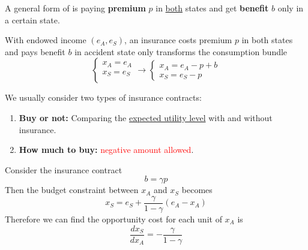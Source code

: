 \documentclass[]{article}
\begin{document}
                \begin{definition}
                    A general form of  is paying \textbf{premium} $p$ in \ul{both} states and get \textbf{benefit} $b$ only in a certain state.
                \end{definition}
                
                \begin{example}
                    With endowed income $(e_A, e_S)$, an insurance costs premium $p$ in both states and pays benefit $b$ in accident state only transforms the consumption bundle
                    \[
                        \begin{cases}
                            x_A = e_A \\
                            x_S = e_S \\
                        \end{cases} \rightarrow
                        \begin{cases}
                            x_A = e_A - p + b \\
                            x_S = e_S - p
                        \end{cases}
                    \]
                \end{example}
                
                \begin{remark}
                    We usually consider two types of insurance contracts:
                    \begin{enumerate}
                        \item \textbf{Buy or not:} Comparing the \ul{expected utility level} with and without insurance.
                        \item \textbf{How much to buy:} \textcolor{red}{negative amount allowed}.
                    \end{enumerate}
                \end{remark}
                
                \par Consider the insurance contract
                \[
                    b = \gamma p
                \]
                Then the budget constraint between $x_A$ and $x_S$ becomes
                \[
                    x_S = e_S + \frac{\gamma}{1 - \gamma}(e_A - x_A)
                \]
                Therefore we can find the opportunity cost for each unit of $x_A$ is 
                \[
                    \frac{dx_S}{dx_A} = - \frac{\gamma}{1 - \gamma}
                \]
\end{document}
